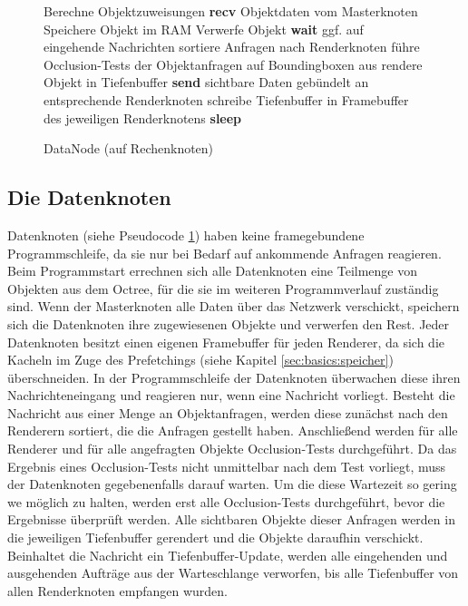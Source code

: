 \begin{figure}[ttt!]
\centering
 \begin{minipage}[t]{13cm}
\begin{algorithm}[H]
  \caption{DataNode (auf Rechenknoten)\label{alg:impl:datanode}} 
    \begin{algorithmic} [1]
      \STATE Berechne Objektzuweisungen
      \STATE \textbf{recv} Objektdaten vom Masterknoten
	\STATE Speichere Objekt im RAM
      \ELSE
	\STATE Verwerfe Objekt
      \ENDIF
	\STATE \textbf{wait} ggf. auf eingehende Nachrichten
	  \STATE sortiere Anfragen nach Renderknoten
	    \STATE führe Occlusion-Tests der Objektanfragen auf Boundingboxen aus
	  \ENDFOR
	    \STATE rendere Objekt in Tiefenbuffer
 	  \ENDFOR
	  \STATE \textbf{send} sichtbare Daten gebündelt an entsprechende Renderknoten
	  \STATE schreibe Tiefenbuffer in Framebuffer des jeweiligen Renderknotens
	\ELSE \STATE\textbf{sleep}
	\ENDIF
      \ENDWHILE
    \end{algorithmic}
\end{algorithm}
 \end{minipage}
\end{figure}

\subsection{Die Datenknoten}
\label{sec:impl:daten}
Datenknoten (siehe Pseudocode \ref{alg:impl:datanode}) haben keine framegebundene Programmschleife, da sie nur bei Bedarf auf ankommende Anfragen reagieren. Beim Programmstart errechnen sich alle Datenknoten eine Teilmenge von Objekten aus dem Octree, für die sie im weiteren Programmverlauf zuständig sind. Wenn der Masterknoten alle Daten über das Netzwerk verschickt, speichern sich die Datenknoten ihre zugewiesenen Objekte und verwerfen den Rest. Jeder Datenknoten besitzt einen eigenen Framebuffer für jeden Renderer, da sich die Kacheln im Zuge des Prefetchings (siehe Kapitel \ref{sec:basics:speicher}) überschneiden. In der Programmschleife der Datenknoten überwachen diese ihren Nachrichteneingang und reagieren nur, wenn eine Nachricht vorliegt. Besteht die Nachricht aus einer Menge an Objektanfragen, werden diese zunächst nach den Renderern sortiert, die die Anfragen gestellt haben. Anschließend werden für alle Renderer und für alle angefragten Objekte Occlusion-Tests durchgeführt. Da das Ergebnis eines Occlusion-Tests nicht unmittelbar nach dem Test vorliegt, muss der Datenknoten gegebenenfalls darauf warten. Um die diese Wartezeit so gering we möglich zu halten, werden erst alle Occlusion-Tests durchgeführt, bevor die Ergebnisse überprüft werden. Alle sichtbaren Objekte dieser Anfragen werden in die jeweiligen Tiefenbuffer gerendert und die Objekte daraufhin verschickt. Beinhaltet die Nachricht ein Tiefenbuffer-Update, werden alle eingehenden und ausgehenden Aufträge aus der Warteschlange verworfen, bis alle Tiefenbuffer von allen Renderknoten empfangen wurden.


